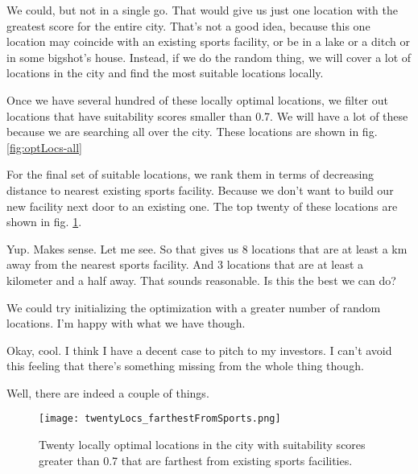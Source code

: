 We could, but not in a single go. That would give us just one location with the greatest score for the entire city. That's not a good idea, because this one location may coincide with an existing sports facility, or be in a lake or a ditch or in some bigshot's house. Instead, if we do the random thing, we will cover a lot of locations in the city and find the most suitable locations locally. 

Once we have several hundred of these locally optimal locations, we filter out locations that have suitability scores smaller than 0.7. We will have a lot of these because we are searching all over the city. These locations are shown in fig. \ref{fig:optLocs-all}



For the final set of suitable locations, we rank them in terms of decreasing distance to nearest existing sports facility. Because we don't want to build our new facility next door to an existing one. The top twenty of these locations are shown in fig. \ref{fig:optLocs-twenty}.


{\color{blue} Yup. Makes sense. Let me see. So that gives us 8 locations that are at least a km away from the nearest sports facility. And 3 locations that are at least a kilometer and a half away. That sounds reasonable. Is this the best we can do?}

We could try initializing the optimization with a greater number of random locations. I'm happy with what we have though.

{\color{blue} Okay, cool. I think I have a decent case to pitch to my investors. I can't avoid this feeling that there's something missing from the whole thing though.}

Well, there are indeed a couple of things. 

\begin{figure}[h!]
	\centering
	\texttt{[image: twentyLocs\_farthestFromSports.png]}
	\caption{Twenty locally optimal locations in the city with suitability scores greater than 0.7 that are farthest from existing sports facilities. \label{fig:optLocs-twenty}}
\end{figure}

